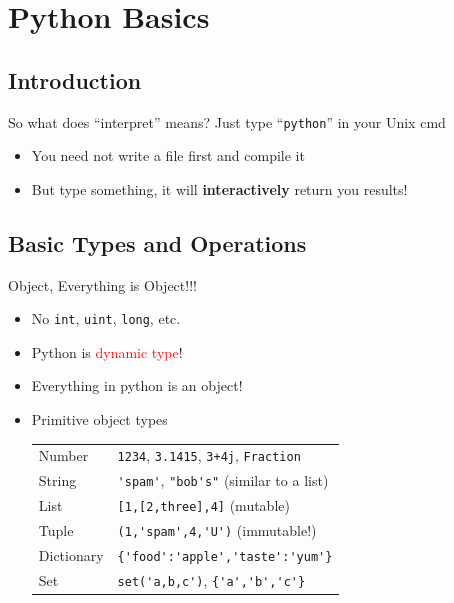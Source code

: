 \documentclass{../TexTemplate/myslide}
\begin{document}
\section{Python Basics}
\begin{frame}
\sectionpage
\end{frame}

\subsection{Introduction}
\begin{frame}[fragile]{So what does ``interpret'' means?}
Just type ``\verb'python''' in your Unix cmd
\begin{itemize}
	\item You need not write a file first and compile it
	\item But type something, it will \textbf{interactively} return you results!
\end{itemize}
\end{frame}

\subsection{Basic Types and Operations}
\begin{frame}[fragile]{Object, Everything is Object!!!}
\begin{itemize}[<+->]
\item No \verb'int', \verb'uint', \verb'long', etc.
\item Python is \textcolor{red}{dynamic type}!
\item Everything in python is an object!
\item Primitive object types
\begin{center}
\begin{tabular}{ll}\hline
Number & \verb'1234', \verb'3.1415', \verb'3+4j', \verb'Fraction'\\
String & \verb;'spam';, \verb;"bob's"; (similar to a list)\\
List & \verb'[1,[2,three],4]' (mutable)\\
Tuple & \verb;(1,'spam',4,'U'); (immutable!)\\
Dictionary & \verb;{'food':'apple','taste':'yum'};\\
Set & \verb;set('a,b,c');, \verb;{'a','b','c'};\\\hline
\end{tabular}
\end{center}
\end{itemize}
\end{frame}
\end{document}
